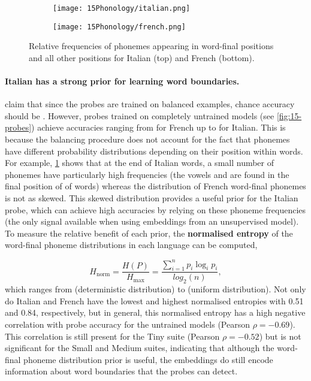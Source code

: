 \begin{figure}[t]
\centering
\begin{subfigure}{0.75\linewidth}
    \texttt{[image: 15Phonology/italian.png]}
\end{subfigure}
\hfill
\begin{subfigure}{0.75\linewidth}
    \texttt{[image: 15Phonology/french.png]}
\end{subfigure}
\hfill
\caption{Relative frequencies of phonemes appearing in word-final positions and all other positions for Italian (top) and French (bottom).}
\label{fig:15-frequencies}
\end{figure}


\paragraph{Italian has a strong prior for learning word boundaries.}
\citet{hahn-baroni-2019-tabula} claim that since the probes are trained on balanced examples, chance accuracy should be . However, probes trained on completely untrained models (see \cref{fig:15-probes}) achieve accuracies ranging from  for French up to  for Italian. This is because the balancing procedure does not account for the fact that phonemes have different probability distributions depending on their position within words. For example, \cref{fig:15-frequencies} shows that at the end of Italian words, a small number of phonemes have particularly high frequencies (the vowels  and  are found in the final position of  of words) whereas the distribution of French word-final phonemes is not as skewed. This skewed distribution provides a useful prior for the Italian probe, which can achieve high accuracies by relying on these phoneme frequencies (the only signal available when using embeddings from an unsupervised model). To measure the relative benefit of each prior, the \textbf{normalised entropy} of the word-final phoneme distributions in each language can be computed, 

$$H_\mathrm{norm}=\frac{H(P)}{H_\mathrm{max}} = \frac{\sum_{i=1}^np_i\log_ip_i}{log_2(n)},$$ 
which ranges from  (deterministic distribution) to  (uniform distribution). Not only do Italian and French have the lowest and highest normalised entropies with 0.51 and 0.84, respectively, but in general, this normalised entropy has a high negative correlation with probe accuracy for the untrained models (Pearson $\rho = -0.69$). This correlation is still present for the Tiny suite (Pearson $\rho = -0.52$) but is not significant for the Small and Medium suites, indicating that although the word-final phoneme distribution prior is useful, the embeddings do still encode information about word boundaries that the probes can detect.


